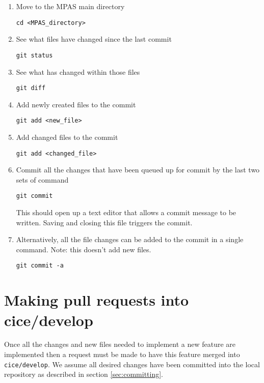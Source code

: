\documentclass{article}
\begin{document}
\begin{enumerate}

\item Move to the MPAS main directory

\verb+cd <MPAS_directory>+

\item See what files have changed since the last commit

\verb+git status+

\item See what has changed within those files

\verb+git diff+

\item Add newly created files to the commit

\verb+git add <new_file>+

\item Add changed files to the commit

\verb+git add <changed_file>+

\item Commit all the changes that have been queued up for commit by the last two sets of command

\verb+git commit+

This should open up a text editor that allows a commit message to be written. Saving and closing this file triggers the commit.

\item Alternatively, all the file changes can be added to the commit in a single command. Note: this doesn't add new files.

\verb+git commit -a+


\end{enumerate}


\section{Making pull requests into cice/develop}
\label{sec:pull_request}

Once all the changes and new files needed to implement a new feature are implemented then a request must be made to have this feature merged into \verb+cice/develop+. We assume all desired changes have been committed into the local repository as described in section \ref{sec:committing}.
\end{document}
